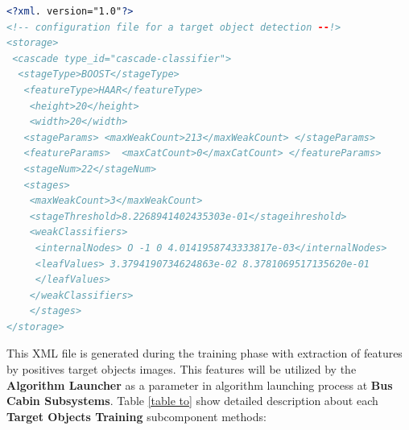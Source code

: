 \begin{changemargin}{1.5cm}{1.5cm} 
\begin{center}
\begin{lstlisting}[caption={Example of a target object definition file.},label={config_file},language=XML]
<?xml. version="1.0"?> 
<!-- configuration file for a target object detection --!>
<storage> 
 <cascade type_id="cascade-classifier">
  <stageType>BOOST</stageType> 
   <featureType>HAAR</featureType> 
    <height>20</height> 
    <width>20</width> 
   <stageParams> <maxWeakCount>213</maxWeakCount> </stageParams> 
   <featureParams>  <maxCatCount>0</maxCatCount> </featureParams> 
   <stageNum>22</stageNum> 
   <stages> 
    <maxWeakCount>3</maxWeakCount> 
	<stageThreshold>8.2268941402435303e-01</stageihreshold>
	<weakClassifiers> 
	 <internalNodes> O -1 0 4.0141958743333817e-03</internalNodes>
	 <leafValues> 3.3794190734624863e-02 8.3781069517135620e-01
     </leafValues>
    </weakClassifiers>
    </stages>
</storage> 
\end{lstlisting}
\end{center}
\end{changemargin}

This XML file is generated during the training phase with extraction of features by positives target objects images. This features will be utilized by the \textbf{Algorithm Launcher} as a parameter in algorithm launching process at \textbf{Bus Cabin Subsystems}. Table \ref{table to} show detailed description about each \textbf{Target Objects Training} subcomponent methods:
\begin{center}
  \label{table to} %
  \begin{tabular}{|c|c|c|c|c|c|}
  \end{tabular}
\end{center}
\tabulinesep=2.0mm

